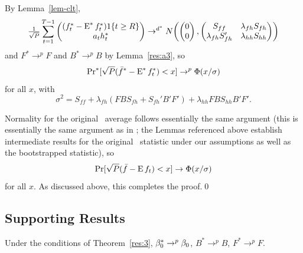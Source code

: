 \documentclass[12pt,fleqn]{article}
\begin{document}
  By Lemma~\ref{lem-clt},
  \begin{equation}\label{eq:19}
    \tfrac{1}{\sqrt{P}} \sum_{t=1}^{T-1} \begin{pmatrix}
      (f_t^* - \operatorname{E}^* f_t^*) 1\{t \geq R\} \\ a_t h_t^*
    \end{pmatrix} \to^{d^*}
    N\!
    \begin{pmatrix}
      \begin{pmatrix} 0 \\ 0 \end{pmatrix},
      \begin{pmatrix}
        S_{ff} & \lambda_{fh} S_{fh} \\
        \lambda_{fh} S_{fh}' &  \lambda_{hh} S_{hh}
      \end{pmatrix}
    \end{pmatrix}
  \end{equation}
  and $F^* \to^p F$ and $B^* \to^p B$ by Lemma~\ref{res:a3}, so
  \begin{equation}\label{eq:2}
    \operatorname{Pr}^*[\sqrt{P} (\bar f^* - \operatorname{E}^* f_t^*) < x] \to^p \Phi(x / \sigma)
  \end{equation}
  for all $x$, with
  \begin{equation*}
    \sigma^2 = S_{ff} + \lambda_{fh} (F B S_{fh} + S_{fh}' B'F') + \lambda_{hh} F B S_{hh} B' F'.
  \end{equation*}

  Normality for the original \oos\ average follows essentially the
  same argument (this is essentially the same argument as in
  \citealp{Wes:96}; the Lemmas referenced above establish intermediate
  results for the original \oos\ statistic under our assumptions as
  well as the bootstrapped statistic), so
  \begin{equation}\label{eq:3}
    \operatorname{Pr}[\sqrt{P} (\bar f - \operatorname{E} f_t) < x] \to \Phi(x / \sigma)
  \end{equation}
  for all $x$. As discussed above, this completes the proof.\qed

\subsection{Supporting Results}

\begin{lema}\label{res:a3}
  Under the conditions of Theorem~\ref{res:3}, $\beta_0^* \to^p
  \beta_0$, $B^* \to^p B$, $F^* \to^p F$.
\end{lema}
\end{document}

